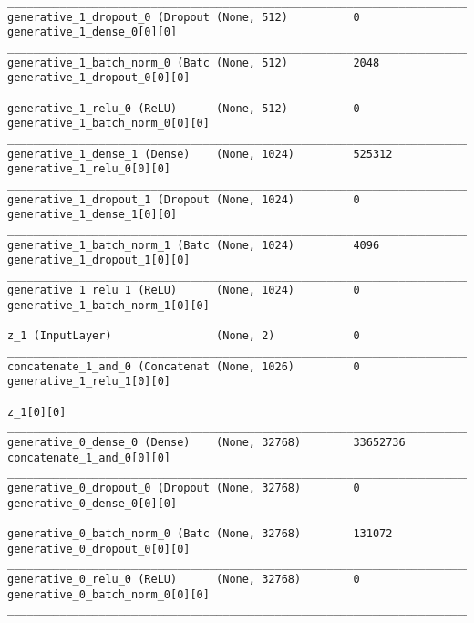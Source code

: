 \begin{lstlisting}[caption={CelebA-VLAE Decoder},captionpos=b,basicstyle=\tiny, label={lst:celeba-vlae-decoder}]
__________________________________________________________________________________________________
generative_1_dropout_0 (Dropout (None, 512)          0           generative_1_dense_0[0][0]
__________________________________________________________________________________________________
generative_1_batch_norm_0 (Batc (None, 512)          2048        generative_1_dropout_0[0][0]
__________________________________________________________________________________________________
generative_1_relu_0 (ReLU)      (None, 512)          0           generative_1_batch_norm_0[0][0]
__________________________________________________________________________________________________
generative_1_dense_1 (Dense)    (None, 1024)         525312      generative_1_relu_0[0][0]
__________________________________________________________________________________________________
generative_1_dropout_1 (Dropout (None, 1024)         0           generative_1_dense_1[0][0]
__________________________________________________________________________________________________
generative_1_batch_norm_1 (Batc (None, 1024)         4096        generative_1_dropout_1[0][0]
__________________________________________________________________________________________________
generative_1_relu_1 (ReLU)      (None, 1024)         0           generative_1_batch_norm_1[0][0]
__________________________________________________________________________________________________
z_1 (InputLayer)                (None, 2)            0
__________________________________________________________________________________________________
concatenate_1_and_0 (Concatenat (None, 1026)         0           generative_1_relu_1[0][0]
                                                                 z_1[0][0]
__________________________________________________________________________________________________
generative_0_dense_0 (Dense)    (None, 32768)        33652736    concatenate_1_and_0[0][0]
__________________________________________________________________________________________________
generative_0_dropout_0 (Dropout (None, 32768)        0           generative_0_dense_0[0][0]
__________________________________________________________________________________________________
generative_0_batch_norm_0 (Batc (None, 32768)        131072      generative_0_dropout_0[0][0]
__________________________________________________________________________________________________
generative_0_relu_0 (ReLU)      (None, 32768)        0           generative_0_batch_norm_0[0][0]
__________________________________________________________________________________________________

\end{lstlisting}
